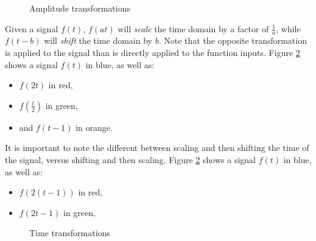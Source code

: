 \documentclass[12pt]{article}
\begin{document}
\begin{figure}[ht!]
    \centering
\caption{Amplitude transformations}
\label{fig:amplitude-scale-shifts}
\end{figure}

Given a signal $f(t)$, $f(at)$ will \emph{scale} the time domain by a factor of $\frac{1}{a}$, while $f(t - b)$ will \emph{shift} the time domain by $b$. Note that the opposite transformation is applied to the signal than is directly applied to the function inputs. Figure \ref{fig:time-scale-shifts} shows a signal $f(t)$ in blue, as well as:
\begin{itemize}
    \item $f(2t)$ in red,
    \item $f(\frac{t}{2})$ in green,
    \item and $f(t - 1)$ in orange.
\end{itemize}

It is important to note the different between scaling and then shifting the time of the signal, versus shifting and then scaling. Figure \ref{fig:time-scale-shifts} shows a signal $f(t)$ in blue, as well as:
\begin{itemize}
    \item $f(2(t-1))$ in red,
    \item $f(2t-1)$ in green,
\end{itemize}

\begin{figure}[ht!]
    \centering
\caption{Time transformations}
\label{fig:time-scale-shifts}
\end{figure}
\end{document}
